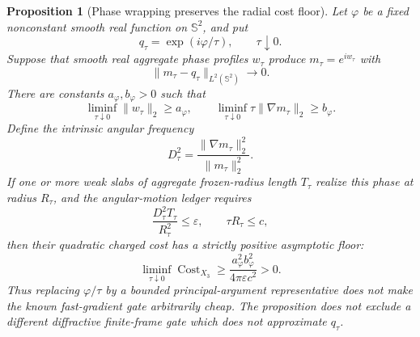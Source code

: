 \documentclass[11pt]{article}
\newtheorem{proposition}[theorem]{Proposition}
\theoremstyle{remark}
\begin{document}
\begin{proposition}[Phase wrapping preserves the radial cost floor]
\label{prop:phase-wrapping-cost-no-go}
Let $\varphi$ be a fixed nonconstant smooth real function on
$\mathbb S^2$, and put
\[
 q_\tau=\exp(i\varphi/\tau),\qquad \tau\downarrow0.
\]
Suppose that smooth real aggregate phase profiles $w_\tau$ produce
$m_\tau=e^{iw_\tau}$ with
\begin{equation}
 \|m_\tau-q_\tau\|_{L^2(\mathbb S^2)}\longrightarrow0.
 \label{eq:wrapped-phase-approximation}
\end{equation}
There are constants $a_\varphi,b_\varphi>0$ such that
\begin{equation}
 \liminf_{\tau\downarrow0}\|w_\tau\|_2\geq a_\varphi,
 \qquad
 \liminf_{\tau\downarrow0}
 \tau\|\nabla m_\tau\|_2\geq b_\varphi.
 \label{eq:wrapped-phase-invariants}
\end{equation}
Define the intrinsic angular frequency
\[
 D_\tau^2=
 \frac{\|\nabla m_\tau\|_2^2}{\|m_\tau\|_2^2}.
\]
If one or more weak slabs of aggregate frozen-radius length $T_\tau$ realize
this phase at radius $R_\tau$, and the angular-motion ledger requires
\begin{equation}
 \frac{D_\tau^2T_\tau}{R_\tau^2}\leq\varepsilon,
 \qquad
 \tau R_\tau\leq c,
 \label{eq:wrapped-phase-radial-ledger}
\end{equation}
then their quadratic charged cost has a strictly positive asymptotic floor:
\begin{equation}
 \liminf_{\tau\downarrow0}\operatorname{Cost}_{X_3}
 \geq
 \frac{a_\varphi^2b_\varphi^2}
 {4\pi\varepsilon c^2}>0.
 \label{eq:wrapped-phase-cost-floor}
\end{equation}
Thus replacing $\varphi/\tau$ by a bounded principal-argument
representative does not make the known fast-gradient gate arbitrarily cheap.
The proposition does not exclude a different diffractive finite-frame gate
which does not approximate $q_\tau$.
\end{proposition}
\end{document}

